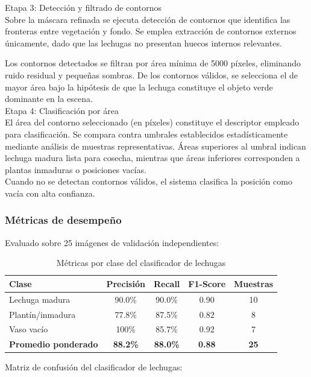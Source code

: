 Etapa 3: Detección y filtrado de contornos\\
\noindent
Sobre la máscara refinada se ejecuta detección de contornos que identifica las fronteras entre vegetación y fondo. Se emplea extracción de contornos externos únicamente, dado que las lechugas no presentan huecos internos relevantes.

Los contornos detectados se filtran por área mínima de 5000 píxeles, eliminando ruido residual y pequeñas sombras. De los contornos válidos, se selecciona el de mayor área bajo la hipótesis de que la lechuga constituye el objeto verde dominante en la escena.\\

Etapa 4: Clasificación por área\\
\noindent
El área del contorno seleccionado (en píxeles) constituye el descriptor empleado para clasificación. Se compara contra umbrales establecidos estadísticamente mediante análisis de muestras representativas. Áreas superiores al umbral indican lechuga madura lista para cosecha, mientras que áreas inferiores corresponden a plantas inmaduras o posiciones vacías.\\
Cuando no se detectan contornos válidos, el sistema clasifica la posición como vacía con alta confianza.
\subsubsection{Métricas de desempeño}
Evaluado sobre 25 imágenes de validación independientes:

\begin{table}[H]
\centering
\begin{tabular}{|l|c|c|c|c|}
\hline
\textbf{Clase} & \textbf{Precisión} & \textbf{Recall} & \textbf{F1-Score} & \textbf{Muestras} \\ \hline
Lechuga madura & 90.0\% & 90.0\% & 0.90 & 10 \\ \hline
Plantín/inmadura & 77.8\% & 87.5\% & 0.82 & 8 \\ \hline
Vaso vacío & 100\% & 85.7\% & 0.92 & 7 \\ \hline
\textbf{Promedio ponderado} & \textbf{88.2\%} & \textbf{88.0\%} & \textbf{0.88} & \textbf{25} \\ \hline
\end{tabular}
\caption{Métricas por clase del clasificador de lechugas}
\label{tab:metricas_lechugas}
\end{table}

Matriz de confusión del clasificador de lechugas:

